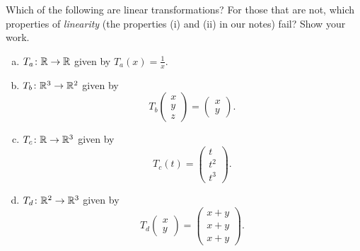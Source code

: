 \documentclass[12pt]{article} %
\begin{document}
\newpage
\begin{problem}
Which of the following are linear transformations? For those that are not, which properties of \emph{linearity} (the properties (i) and (ii) in our notes) fail? Show your work.
\begin{enumerate}[(a)]
    \item $T_a \colon \mathbb{R} \to \mathbb{R}$ given by $T_a(x)=\frac{1}{x}$.
    \item $T_b \colon \mathbb{R}^3 \to \mathbb{R}^2$ given by
    \[
    T_b \begin{pmatrix} x\\ y\\ z \end{pmatrix}
    = \begin{pmatrix} x\\ y \end{pmatrix}.
    \]
    \item $T_c \colon \mathbb{R} \to \mathbb{R}^3$ given by
    \[
    T_c(t)=\begin{pmatrix} t\\ t^2\\ t^3 \end{pmatrix}.
    \]
    \item $T_d \colon \mathbb{R}^2 \to \mathbb{R}^3$ given by
    \[
    T_d \begin{pmatrix} x\\ y \end{pmatrix}
    = \begin{pmatrix} x+y\\ x+y\\ x+y \end{pmatrix}.
    \]
\end{enumerate}
\end{problem}
\end{document}
